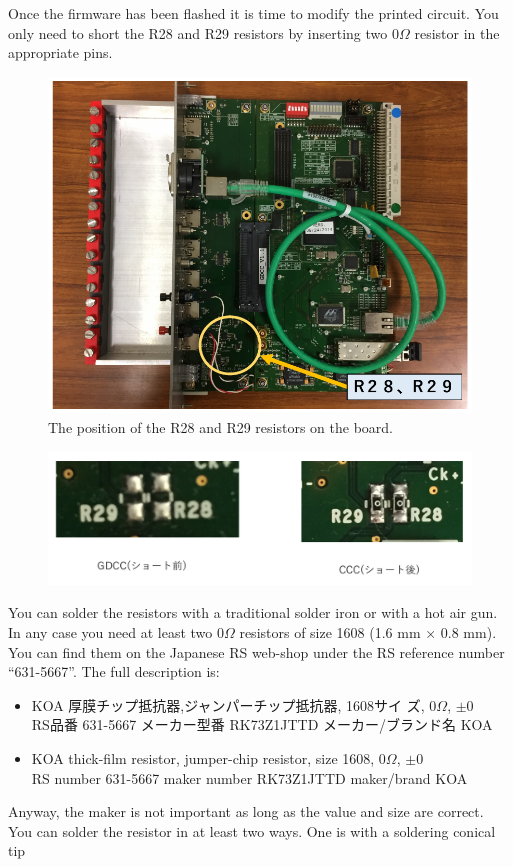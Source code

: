 Once the firmware has been flashed it is time to modify the printed circuit. You
only need to short the R28 and R29 resistors by inserting two $0\Omega$ resistor
in the appropriate pins.
\begin{figure}[ht]
  \centering \includegraphics[width=0.5\linewidth,frame]{GDCC-CCC1}
  \caption{The position of the R28 and R29 resistors on the board.}
\end{figure}
\begin{figure}[ht]
  \centering \includegraphics[width=0.8\linewidth]{GDCC-CCC2}
\end{figure}
You can solder the resistors with a traditional solder iron or with a hot air
gun. In any case you need at least two $0\Omega$ resistors of size 1608 (1.6 mm
× 0.8 mm). You can find them on the Japanese RS web-shop under the RS reference number
``631-5667''. The full description is:
\begin{itemize}
\item \begin{CJK}{UTF8}{min}KOA 厚膜チップ抵抗器,ジャンパーチップ抵抗器, 1608サイ
    ズ, $0\Omega$, $\pm
    0$ \\
    RS品番 631-5667 メーカー型番 RK73Z1JTTD メーカー/ブランド名 KOA\end{CJK}
\item KOA thick-film resistor, jumper-chip resistor, size 1608, $0\Omega$, $\pm
  0$ \\
  RS number 631-5667 maker number RK73Z1JTTD maker/brand KOA
\end{itemize}
Anyway, the maker is not important as long as the value and size are correct.
You can solder the resistor in at least two ways. One is with a soldering conical tip 
